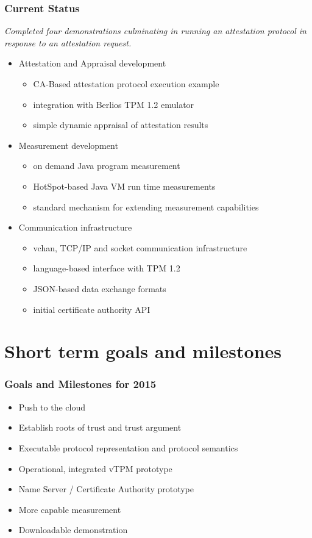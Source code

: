 \documentclass{beamer}
\begin{document}
\begin{frame}
  \frametitle{Current Status}

  \emph{\color{kublue}Completed four demonstrations culminating in
    running an attestation protocol in response to an attestation
    request.}

  \begin{itemize}
  \item Attestation and Appraisal development
    \begin{itemize}
    \item CA-Based attestation protocol execution example
    \item integration with Berlios TPM 1.2 emulator
    \item simple dynamic appraisal of attestation results
    \end{itemize}
  \item Measurement development
    \begin{itemize}
    \item on demand Java program measurement
    \item HotSpot-based Java VM run time measurements
    \item standard mechanism for extending measurement capabilities
    \end{itemize}
  \item Communication infrastructure
    \begin{itemize}
    \item vchan, TCP/IP and socket communication infrastructure
    \item language-based interface with TPM 1.2
    \item JSON-based data exchange formats
    \item initial certificate authority API
    \end{itemize}
  \end{itemize}
\end{frame}

\section{Short term goals and milestones}

\begin{frame}
  \frametitle{Goals and Milestones for 2015}

  \begin{itemize}
  \item Push to the cloud
  \item Establish roots of trust and trust argument
  \item Executable protocol representation and protocol semantics
  \item Operational, integrated vTPM prototype
  \item Name Server / Certificate Authority prototype
  \item More capable measurement
  \item Downloadable demonstration
  \end{itemize}
\end{frame}
\end{document}
